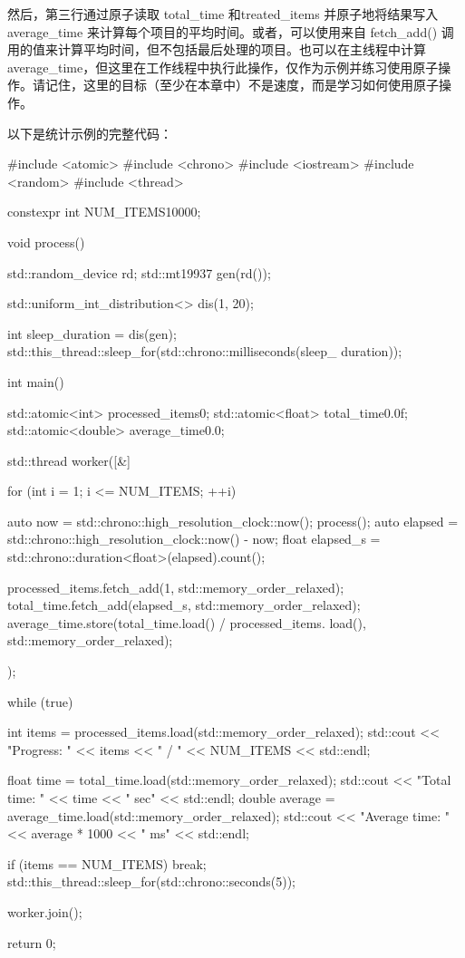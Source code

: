 然后，第三行通过原子读取 total\_time 和treated\_items 并原子地将结果写入 average\_time 来计算每个项目的平均时间。或者，可以使用来自 fetch\_add() 调用的值来计算平均时间，但不包括最后处理的项目。也可以在主线程中计算 average\_time，但这里在工作线程中执行此操作，仅作为示例并练习使用原子操作。请记住，这里的目标（至少在本章中）不是速度，而是学习如何使用原子操作。

以下是统计示例的完整代码：

\begin{cpp}
#include <atomic>
#include <chrono>
#include <iostream>
#include <random>
#include <thread>

constexpr int NUM_ITEMS{10000};

void process() {
    std::random_device rd;
    std::mt19937 gen(rd());

    std::uniform_int_distribution<> dis(1, 20);

    int sleep_duration = dis(gen);
        std::this_thread::sleep_for(std::chrono::milliseconds(sleep_
    duration));
}

int main() {
    std::atomic<int> processed_items{0};
    std::atomic<float> total_time{0.0f};
    std::atomic<double> average_time{0.0};

    std::thread worker([&] {
        for (int i = 1; i <= NUM_ITEMS; ++i) {
            auto now = std::chrono::high_resolution_clock::now();
            process();
            auto elapsed =
                std::chrono::high_resolution_clock::now() - now;
            float elapsed_s =
                std::chrono::duration<float>(elapsed).count();

            processed_items.fetch_add(1, std::memory_order_relaxed);
            total_time.fetch_add(elapsed_s, std::memory_order_relaxed);
            average_time.store(total_time.load() / processed_items.
            load(), std::memory_order_relaxed);
        }
    });

    while (true) {
        int items = processed_items.load(std::memory_order_relaxed);
        std::cout << "Progress: " << items << " / " << NUM_ITEMS <<
        std::endl;

        float time = total_time.load(std::memory_order_relaxed);
        std::cout << "Total time: " << time << " sec" << std::endl;
        double average = average_time.load(std::memory_order_relaxed);
        std::cout << "Average time: " << average * 1000 << " ms" << std::endl;

        if (items == NUM_ITEMS) {
            break;
        }
        std::this_thread::sleep_for(std::chrono::seconds(5));
    }
    worker.join();

    return 0;
}
\end{cpp}

